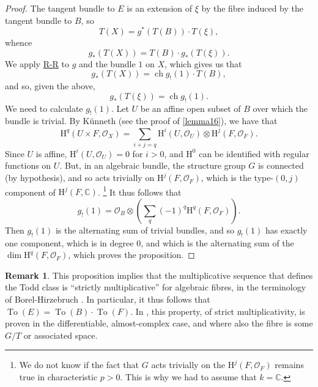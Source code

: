 \documentclass{article}
\theoremstyle{plain}
\theoremstyle{definition}
\newtheorem*{remark}{Remark}
\newcommand{\sh}{\mathscr}
\newcommand{\HH}{\mathrm{H}}
\DeclareMathOperator{\ch}{ch}
\newcommand{\oldpage}[1]{\marginpar{\footnotesize$\Big\vert$ \textit{p.~#1}}}
\begin{document}
\begin{proof}
  The tangent bundle to $E$ is an extension of $\xi$ by the fibre induced by the tangent bundle to $B$, so
  \[
    T(X) = g^*(T(B))\cdot T(\xi),
  \]
  whence
  \[
    g_*(T(X)) = T(B)\cdot g_*(T(\xi)).
  \]
  We apply \hyperref[theoremriemannroch]{R-R} to $g$ and the bundle $1$ on $X$, which gives us that
  \[
    g_*(T(X)) = \ch g_!(1)\cdot T(B),
  \]
  and so, given the above,
  \[
    g_*(T(\xi)) = \ch g_!(1).
  \]
  We need to calculate $g_!(1)$.
  Let $U$ be an affine open subset of $B$ over which the bundle is trivial.
  By K\"{u}nneth (see the proof of \cref{lemma16}), we have that
  \[
    \HH^q(U\times F,\sh{O}_X)
    = \sum_{i+j=q} \HH^i(U,\sh{O}_U)\otimes\HH^j(F,\sh{O}_F).
  \]
  Since $U$ is affine, $\HH^i(U,\sh{O}_U)=0$ for $i>0$, and $\HH^0$ can be identified with regular functions on $U$.
  But, in an algebraic bundle, the structure group $G$ is connected (by hypothesis), and so acts trivially on $\HH^j(F,\sh{O}_F)$, which is the type-$(0,j)$ component of $\HH^j(F,\mathbb{C})$.
  \footnote{We do not know if the fact that $G$ acts trivially on the $\HH^j(F,\sh{O}_F)$ remains true in characteristic $p>0$. This is why we had to assume that $k=\mathbb{C}$.}
  It thus follows that
  \[
    g_!(1)
    = \sh{O}_B \otimes \left(
      \sum_q (-1)^q \HH^q(F,\sh{O}_F)
    \right).
  \]
  Then $g_!(1)$ is the alternating sum of trivial bundles, and so $g_!(1)$ has exactly one component, which is in degree $0$, and which is the alternating sum of the $\dim\HH^q(F,\sh{O}_F)$, which proves the proposition.
\end{proof}

\oldpage{136}
\begin{remark}
  This proposition implies that the multiplicative sequence that defines the Todd class is ``strictly multiplicative'' for algebraic fibres, in the terminology of Borel-Hirzebruch \cite{2}.
  In particular, it thus follows that $\operatorname{To}(E)=\operatorname{To}(B)\cdot\operatorname{To}(F)$.
  In \cite{2}, this property, of strict multiplicativity, is proven in the differentiable, almost-complex case, and where also the fibre is some $G/T$ or associated space.
\end{remark}



\nocite{*}

\end{document}
